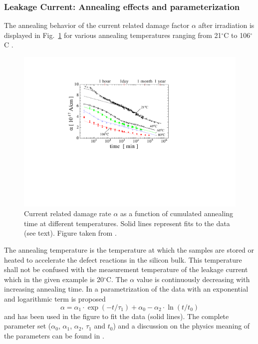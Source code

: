 \subsubsection*{Leakage Current: Annealing effects and parameterization}
The annealing behavior of the current related damage factor $\alpha$ after irradiation is displayed in Fig.~\ref{fig:1999-Moll-phd-basic-leakage-time} 
for various annealing temperatures ranging from 21$^\circ$C to 106$^\circ$C \cite{2002-Moll-micro-macro}. 
\begin{figure}[!t]
\centering
\includegraphics[width=0.8\linewidth]{figures/RadiationEffects/Sensors/1999-Moll-phd-basic-leakage-time.pdf}
\caption{
Current related damage rate $\alpha$ as a function of cumulated annealing time at different temperatures. Solid lines represent fits to the data (see text). Figure taken from \cite{2002-Moll-micro-macro}.}
\label{fig:1999-Moll-phd-basic-leakage-time}
\end{figure}
The annealing temperature is the temperature at which the samples are stored or heated to accelerate the defect reactions in the silicon 
bulk. This temperature shall not be confused with the measurement temperature of the leakage 
current which in the given example is 20$^\circ$C. The $\alpha$ value is 
continuously decreasing with increasing annealing time. 
%
In \cite{1999-Moll-phd, 2002-Moll-micro-macro} a parametrization of the data with an exponential and logarithmic term is proposed
\begin{equation}
\alpha = \alpha_1 \cdot \exp\left(-t/\tau_1 \right) + \alpha_0 -\alpha_2 \cdot \ln\left(t/t_0\right)    	  	
\end{equation}
and has been used in the figure to fit the data (solid lines). The complete parameter set ($\alpha_0$, $\alpha_1$, $\alpha_2$, $\tau_1$ and $t_0$) and a discussion on the physics meaning of the parameters can be found in \cite{1999-Moll-phd,2002-Moll-micro-macro}.
